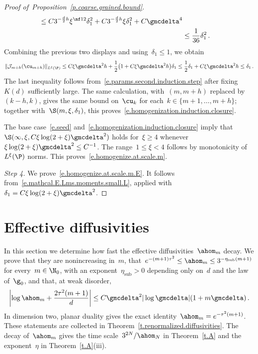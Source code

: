 \documentclass[11pt]{amsart}
\begin{document}
\begin{proof}[{Proof of~Proposition~\ref{p.coarse.grained.bound}}]
\begin{align*}
	\leq
	C 3^{-\frac{d}{2} h}
	\xi^{\nf12} \delta_1^2
	+ C 3^{-\frac{d}{2} h} \xi
	\delta_1^2
	+
	C \gmcdelta^4
	\notag \\ &
	\leq
	\frac1{36} \delta_1^2
	\,.
\end{align*}
Combining the previous two displays and using~$\delta_1\leq1$, we obtain
\begin{equation*}
	\|\mathcal J_{m+h}(\cu_{m+h})\|_{L^\xi(\P)}
	\leq
	C\xi\gmcdelta^2h
	+\frac12\bigl(1+C\xi\gmcdelta^2h\bigr)\delta_1
	\leq
	\frac12\delta_1+C\xi\gmcdelta^2h
	\leq \delta_1
	\,.
\end{equation*}
The last inequality follows from~\eqref{e.params.second.induction.step} after fixing~$K(d)$ sufficiently large. The same calculation, with~$(m,m+h)$ replaced by~$(k-h,k)$, gives the same bound on~$\cu_k$ for each~$k\in\{m+1,\ldots,m+h\}$; together with~$\S(m,\xi,\delta_1)$, this proves~\eqref{e.homogenization.induction.closure}.

\smallskip

The base case~\eqref{e.seed} and~\eqref{e.homogenization.induction.closure} imply that~$\S(\infty,\xi,C\xi\log(2+\xi)\gmcdelta^2)$ holds for~$\xi\geq4$ whenever~$\xi\log(2+\xi)\gmcdelta^2\leq C^{-1}$. The range~$1\leq\xi<4$ follows by monotonicity of~$L^\xi(\P)$ norms. This proves~\eqref{e.homogenize.at.scale.m}.

\smallskip

\emph{Step 4.} We prove~\eqref{e.homogenize.at.scale.m.E}. It follows from~\eqref{e.mathcal.E.Lms.moments.small.L}, applied with~$\delta_1=C\xi\log(2+\xi)\gmcdelta^2$.
\end{proof}

\section{Effective diffusivities}
\label{s.homogenized.diffusivities}

In this section we determine how fast the effective diffusivities~$\ahom_m$ decay.  We prove that they are nonincreasing in~$m$, that~$e^{-(m+1)\tau^2}\leq\ahom_m\leq3^{-\eta_{\mathrm{sub}}(m+1)}$ for every~$m\in\N_0$, with an exponent~$\eta_{\mathrm{sub}}>0$ depending only on~$d$ and the law of~$\g_0$, and that, at weak disorder,
\begin{equation*}
	\left|
	\log\ahom_m+\frac{2\tau^2(m+1)}d
	\right|
	\leq
	C\gmcdelta^2|\log\gmcdelta|(1+m\gmcdelta)\,.
\end{equation*}
In dimension two, planar duality gives the exact identity~$\ahom_m=e^{-\tau^2(m+1)}$.  These statements are collected in Theorem~\ref{t.renormalized.diffusivities}.  The decay of~$\ahom_m$ gives the time scale~$3^{2N}/\ahom_N$ in Theorem~\ref{t.A} and the exponent~$\eta$ in Theorem~\ref{t.A}(iii).
\end{document}
